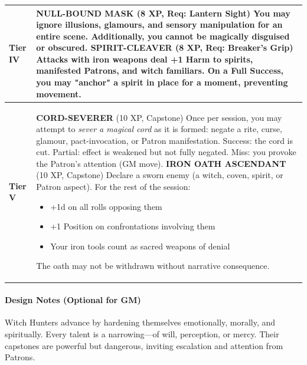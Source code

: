 \documentclass[11pt]{book}
\begin{document}
\begin{center}
\begin{longtable}{|p{2.8cm}|p{11cm}|}
\textbf{Tier IV} &
\textbf{NULL-BOUND MASK} (8 XP, Req: Lantern Sight) \newline
You may ignore illusions, glamours, and sensory manipulation for an entire scene. \newline
Additionally, you cannot be magically disguised or obscured.
\newline\newline
\textbf{SPIRIT-CLEAVER} (8 XP, Req: Breaker's Grip) \newline
Attacks with iron weapons deal +1 Harm to spirits, manifested Patrons, and witch familiars.  
On a Full Success, you may "anchor" a spirit in place for a moment, preventing movement. \\ \hline

\textbf{Tier V} &
\textbf{CORD-SEVERER} (10 XP, Capstone) \newline
Once per session, you may attempt to \emph{sever a magical cord} as it is formed: \newline
negate a rite, curse, glamour, pact-invocation, or Patron manifestation. \newline
Success: the cord is cut. \newline
Partial: effect is weakened but not fully negated. \newline
Miss: you provoke the Patron's attention (GM move). 
\newline\newline
\textbf{IRON OATH ASCENDANT} (10 XP, Capstone) \newline
Declare a sworn enemy (a witch, coven, spirit, or Patron aspect). \newline
For the rest of the session:  
\begin{itemize}
    \item +1d on all rolls opposing them  
    \item +1 Position on confrontations involving them  
    \item Your iron tools count as sacred weapons of denial  
\end{itemize}
The oath may not be withdrawn without narrative consequence. \\ \hline

\end{longtable}
\end{center}

\medskip

\paragraph{Design Notes (Optional for GM)}
Witch Hunters advance by hardening themselves emotionally, morally, and spiritually.  
Every talent is a narrowing---of will, perception, or mercy.  
Their capstones are powerful but dangerous, inviting escalation and attention from Patrons.
\end{document}
